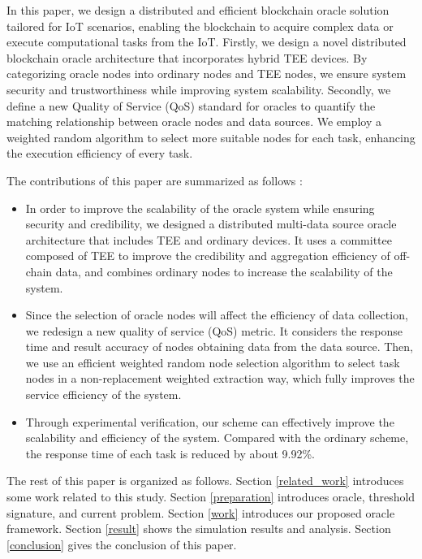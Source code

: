 \documentclass[paper]{ieice}
\begin{document}
In this paper, we design a distributed and efficient blockchain oracle solution tailored for IoT scenarios, enabling the blockchain to acquire complex data or execute computational tasks from the IoT. Firstly, we design a novel distributed blockchain oracle architecture that incorporates hybrid TEE devices. By categorizing oracle nodes into ordinary nodes and TEE nodes, we ensure system security and trustworthiness while improving system scalability. Secondly, we define a new Quality of Service (QoS) standard for oracles to quantify the matching relationship between oracle nodes and data sources. We employ a weighted random algorithm to select more suitable nodes for each task, enhancing the execution efficiency of every task.

The contributions of this paper are summarized as follows :

   \begin{itemize}
        \item In order to improve the scalability of the oracle system while ensuring security and credibility, we designed a distributed multi-data source oracle architecture that includes TEE and ordinary devices. It uses a committee composed of TEE to improve the credibility and aggregation efficiency of off-chain data, and combines ordinary nodes to increase the scalability of the system.
        \item Since the selection of oracle nodes will affect the efficiency of data collection, we redesign a new quality of service (QoS) metric. It considers the response time and result accuracy of nodes obtaining data from the data source. Then, we use an efficient weighted random node selection algorithm to select task nodes in a non-replacement weighted extraction way, which fully improves the service efficiency of the system.
        \item Through experimental verification, our scheme can effectively improve the scalability and efficiency of the system. Compared with the ordinary scheme, the response time of each task is reduced by about 9.92\%.
    \end{itemize}

The rest of this paper is organized as follows. Section \ref{related_work} introduces some work related to this study. Section \ref{preparation} introduces oracle, threshold signature, and current problem. Section \ref{work} introduces our proposed oracle framework. Section \ref{result} shows the simulation results and analysis. Section \ref{conclusion} gives the conclusion of this paper.
\end{document}
